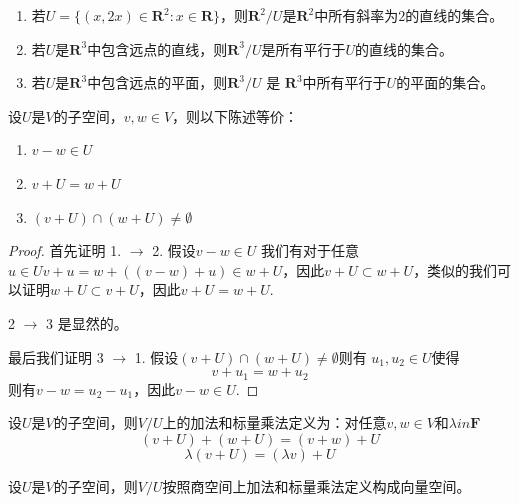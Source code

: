 \documentclass[10pt,a4paper,UTF8]{article}
\begin{document}
\begin{instance}
\begin{enumerate}
\item 若\(U = \{(x,2x)\in \mathbf{R}^{2}:x\in \mathbf{R}\}\)，则\(\mathbf{R}^{2}/U\)是\(\mathbf{R}^{2}\)中所有斜率为\(2\)的直线的集合。
\item 若\(U\)是\(\mathbf{R}^{3}\)中包含远点的直线，则\(\mathbf{R}^{3}/U\)是所有平行于\(U\)的直线的集合。
\item 若\(U\)是\(\mathbf{R}^{3}\)中包含远点的平面，则\(\mathbf{R}^{3}/U\) 是 \(\mathbf{R}^{3}\)中所有平行于\(U\)的平面的集合。
\end{enumerate}
\end{instance}
\begin{theorem}
设\(U\)是\(V\)的子空间，\(v,w\in V\)，则以下陈述等价：
\begin{enumerate}
\item \(v-w\in U\)
\item \(v+ U = w + U\)
\item \((v+U) \cap (w+U) \neq \emptyset\)
\end{enumerate}
\end{theorem}

\begin{proof}
首先证明 1. \(\rightarrow\) 2. 假设\(v-w\in U\) 我们有对于任意\(u\in U v+ u = w +  ( (v-w) +u) \in w+U\)，因此\(v+U \subset w+U\)，类似的我们可以证明\(w+U \subset v+U\)，因此\(v+U = w+U\).

2 \(\rightarrow\) 3 是显然的。

最后我们证明 3 \(\rightarrow\) 1. 假设\((v+U) \cap (w+U) \neq \emptyset\)则有 \(u_{1},u_{2}\in U\)使得\[v+u_{1} = w+u_{2}\] 则有\(v-w = u_{2} - u_{1}\)，因此\(v-w \in U\).
\end{proof}

\begin{definition}
设\(U\)是\(V\)的子空间，则\(V/U\)上的加法和标量乘法定义为：对任意\(v,w\in V\)和\(\lambda in \mathbf{F}\) \[(v+U) + (w+U) = (v+w) + U\] \[\lambda(v+U) = (\lambda v) + U\]
\end{definition}

\begin{theorem}
设\(U\)是\(V\)的子空间，则\(V/U\)按照商空间上加法和标量乘法定义构成向量空间。
\end{theorem}
\end{document}
